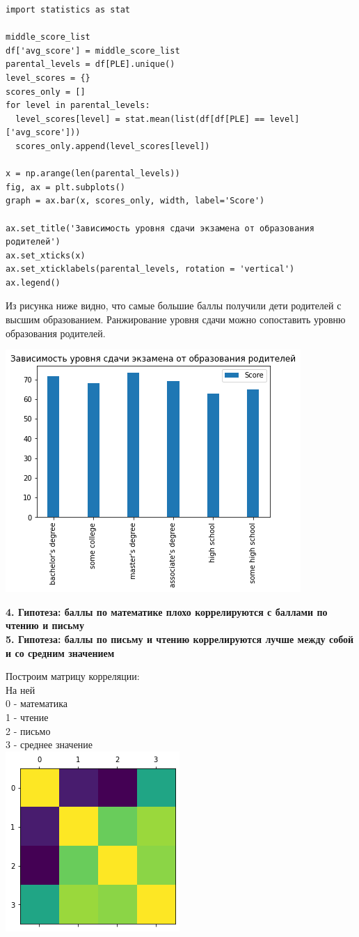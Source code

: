 \documentclass[12pt,a4paper]{article}
\begin{document}
\begin{verbatim}
import statistics as stat

middle_score_list
df['avg_score'] = middle_score_list
parental_levels = df[PLE].unique()
level_scores = {}
scores_only = []
for level in parental_levels:  
  level_scores[level] = stat.mean(list(df[df[PLE] == level]['avg_score']))
  scores_only.append(level_scores[level])

x = np.arange(len(parental_levels))
fig, ax = plt.subplots()
graph = ax.bar(x, scores_only, width, label='Score')

ax.set_title('Зависимость уровня сдачи экзамена от образования родителей')
ax.set_xticks(x)
ax.set_xticklabels(parental_levels, rotation = 'vertical')
ax.legend()

\end{verbatim}

Из рисунка ниже видно, что самые большие баллы получили дети родителей с высшим образованием. Ранжирование уровня сдачи можно сопоставить уровню образования родителей.

\includegraphics{parental_degree_score}

\textbf{4. Гипотеза: баллы по математике плохо коррелируются с баллами по чтению и письму}
\\
\textbf{5. Гипотеза: баллы по письму и чтению коррелируются лучше между собой и со средним значением}

Построим матрицу корреляции:\\
На ней\\
0 - математика\\
1 - чтение\\
2 - письмо\\
3 - среднее значение\\
\includegraphics{corr}
\end{document}
